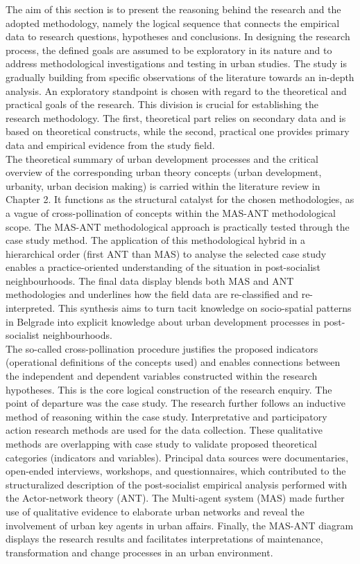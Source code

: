 \documentclass[11pt]{report}
\begin{document}
The aim of this section is to present the reasoning behind the research and the adopted methodology, namely the logical sequence that connects the empirical data to research questions, hypotheses and conclusions. In designing the research process, the defined goals are assumed to be exploratory in its nature and to address methodological investigations and testing in urban studies. The study is gradually building from specific observations of the literature towards an in-depth analysis. An exploratory standpoint is chosen with regard to the theoretical and practical goals of the research. This division is crucial for establishing the research methodology. The first, theoretical part relies on secondary data and is based on theoretical constructs, while the second, practical one provides primary data and empirical evidence from the study field.
\\
The theoretical summary of urban development processes and the critical overview of the corresponding urban theory concepts (urban development, urbanity, urban decision making) is carried within the literature review in Chapter 2. It functions as the structural catalyst for the chosen methodologies, as a vague of cross-pollination of concepts within the MAS-ANT methodological scope.
The MAS-ANT methodological approach is practically tested through the case study method. The application of this methodological hybrid in a hierarchical order (first ANT than MAS) to analyse the selected case study enables a practice-oriented understanding of the situation in post-socialist neighbourhoods. The final data display blends both MAS and ANT methodologies and underlines how the field data are re-classified and re-interpreted. This synthesis aims to turn tacit knowledge on socio-spatial patterns in Belgrade into explicit knowledge about urban development processes in post-socialist neighbourhoods.
\\
The so-called cross-pollination procedure justifies the proposed indicators (operational definitions of the concepts used) and enables connections between the independent and dependent variables constructed within the research hypotheses. This is the core logical construction of the research enquiry.
The point of departure was the case study. The research further follows an inductive method of reasoning within the case study. Interpretative and participatory action research methods are used for the data collection. These qualitative methods are overlapping with case study to validate proposed theoretical categories (indicators and variables). Principal data sources were documentaries, open-ended interviews, workshops, and questionnaires, which contributed to the structuralized description of the post-socialist empirical analysis performed with the Actor-network theory (ANT). The Multi-agent system (MAS) made further use of qualitative evidence to elaborate urban networks and reveal the involvement of urban key agents in urban affairs. Finally, the MAS-ANT diagram displays the research results and facilitates interpretations of maintenance, transformation and change processes in an urban environment.
\end{document}
